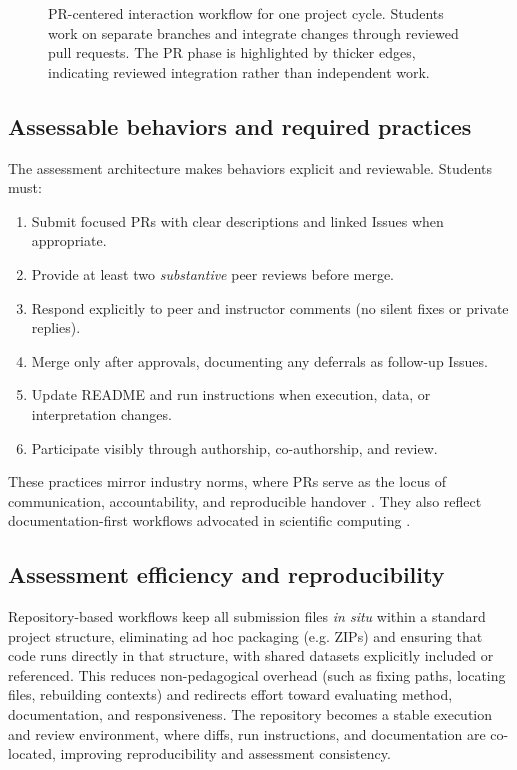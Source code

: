 \begin{figure}[b]
\centering

\caption{PR-centered interaction workflow for one project cycle. Students work on separate branches and integrate changes through reviewed pull requests. The PR phase is highlighted by thicker edges, indicating reviewed integration rather than independent work. 
}
\label{fig:ie-pr-workflow}
\end{figure}

\subsection{Assessable behaviors and required practices}

The assessment architecture makes behaviors explicit and reviewable. Students must:
\begin{enumerate}
    \item Submit focused PRs with clear descriptions and linked Issues when appropriate.
    \item Provide at least two \emph{substantive} peer reviews before merge.
    \item Respond explicitly to peer and instructor comments (no silent fixes or private replies).
    \item Merge only after approvals, documenting any deferrals as follow-up Issues.
    \item Update README and run instructions when execution, data, or interpretation changes.
    \item Participate visibly through authorship, co-authorship, and review.
\end{enumerate}

These practices mirror industry norms, where PRs serve as the locus of communication, accountability, and reproducible handover \parencite{PetreWilson2014WSSSPE}. They also reflect documentation-first workflows advocated in scientific computing \parencite{Wilson2017GoodEnough}.

\subsection{Assessment efficiency and reproducibility}

Repository-based workflows keep all submission files \emph{in situ} within a standard project structure, eliminating ad hoc packaging (e.g. ZIPs) and ensuring that code runs directly in that structure, with shared datasets explicitly included or referenced. This reduces non-pedagogical overhead (such as fixing paths, locating files, rebuilding contexts) and redirects effort toward evaluating method, documentation, and responsiveness. The repository becomes a stable execution and review environment, where diffs, run instructions, and documentation are co-located, improving reproducibility and assessment consistency.


